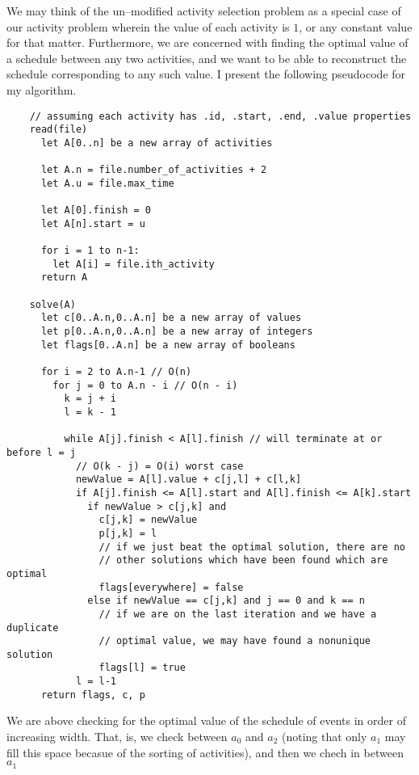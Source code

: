 \documentclass{article}
\begin{document}
    We may think of the un--modified activity selection problem as a special case of
    our activity problem wherein the value of each activity is $1$, or any constant
    value for that matter. 
    Furthermore, we are concerned with finding the optimal value of a schedule between
    any two activities, and we want to be able to reconstruct the schedule corresponding to any such value.
    I present the following pseudocode for my algorithm.
    \begin{verbatim}
    // assuming each activity has .id, .start, .end, .value properties
    read(file)
      let A[0..n] be a new array of activities

      let A.n = file.number_of_activities + 2
      let A.u = file.max_time
      
      let A[0].finish = 0
      let A[n].start = u

      for i = 1 to n-1:
        let A[i] = file.ith_activity
      return A

    solve(A)
      let c[0..A.n,0..A.n] be a new array of values
      let p[0..A.n,0..A.n] be a new array of integers
      let flags[0..A.n] be a new array of booleans

      for i = 2 to A.n-1 // O(n)
        for j = 0 to A.n - i // O(n - i)
          k = j + i
          l = k - 1
          
          while A[j].finish < A[l].finish // will terminate at or before l = j
            // O(k - j) = O(i) worst case            
            newValue = A[l].value + c[j,l] + c[l,k]
            if A[j].finish <= A[l].start and A[l].finish <= A[k].start
              if newValue > c[j,k] and 
                c[j,k] = newValue 
                p[j,k] = l
                // if we just beat the optimal solution, there are no 
                // other solutions which have been found which are optimal
                flags[everywhere] = false
              else if newValue == c[j,k] and j == 0 and k == n
                // if we are on the last iteration and we have a duplicate
                // optimal value, we may have found a nonunique solution
                flags[l] = true
            l = l-1
      return flags, c, p

    \end{verbatim}
    We are above checking for the optimal value of the schedule of events in order of 
    increasing width. 
    That, is, we check between $a_0$ and $a_2$ (noting that only $a_1$ may fill this 
    space becasue of the sorting of activities), and then we chech in between $a_1$ 
\end{document}
